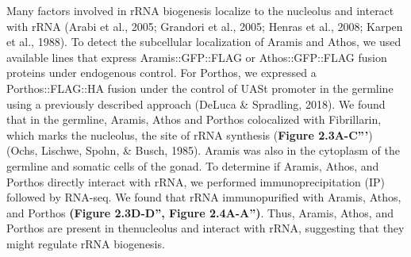 \documentclass[12pt,oneside]{reedthesis}
\begin{document}
Many factors involved in rRNA biogenesis localize to the nucleolus and
interact with rRNA (Arabi et al., 2005; Grandori et al., 2005; Henras et al., 2008; Karpen et al., 1988). To detect
the subcellular localization of Aramis and Athos, we used available
lines that express Aramis::GFP::FLAG or Athos::GFP::FLAG fusion proteins
under endogenous control. For Porthos, we expressed a Porthos::FLAG::HA
fusion under the control of UASt promoter in the germline using a
previously described approach (DeLuca \& Spradling, 2018).
We found that in the germline, Aramis, Athos and Porthos colocalized
with Fibrillarin, which marks the nucleolus, the site of rRNA synthesis
(\textbf{Figure 2.3A-C'''}) (Ochs, Lischwe, Spohn, \& Busch, 1985). Aramis was
also in the cytoplasm of the germline and somatic cells of the gonad. To
determine if Aramis, Athos, and Porthos directly interact with rRNA, we
performed immunoprecipitation (IP) followed by RNA-seq. We found that
rRNA immunopurified with Aramis, Athos, and Porthos \textbf{(Figure 2.3D-D'', Figure 2.4A-A'')}.
Thus, Aramis, Athos, and Porthos are present in thenucleolus and interact with rRNA,
suggesting that they might regulate rRNA biogenesis.
\end{document}
